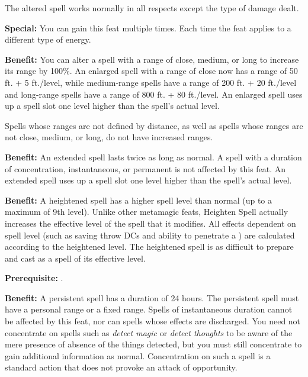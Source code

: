 The altered spell works normally in all respects except the type of damage dealt. 

\textbf{Special:} You can gain this feat multiple times. Each time the feat applies 
to a different type of energy.


\textbf{Benefit:} You can alter a spell with a range of close, medium, or long 
to increase its range by 100\%. An enlarged spell with a range of close now has 
a range of 50 ft. + 5 ft./level, while medium-range spells have a range of 200 
ft. + 20 ft./level and long-range spells have a range of 800 ft. + 80 ft./level. 
An enlarged spell uses up a spell slot one level higher than the spell's actual 
level.

Spells whose ranges are not defined by distance, as well as spells whose ranges 
are not close, medium, or long, do not have increased ranges.


\textbf{Benefit:} An extended spell lasts twice as long as normal. A spell with 
a duration of concentration, instantaneous, or permanent is not affected by this 
feat. An extended spell uses up a spell slot one level higher than the spell's 
actual level.


\textbf{Benefit:} A heightened spell has a higher spell level than normal (up to 
a maximum of 9th level). Unlike other metamagic feats, Heighten Spell actually 
increases the effective level of the spell that it modifies. All effects dependent 
on spell level (such as saving throw DCs and ability to penetrate a )
are calculated according to the heightened level. The 
heightened spell is as difficult to prepare and cast as a spell of its effective 
level.


\textbf{Prerequisite:} .

\textbf{Benefit:} A persistent spell has a duration of 24 hours. The persistent 
spell must have a personal range or a fixed range. Spells of instantaneous duration 
cannot be affected by this feat, nor can spells whose effects are discharged.  
You need not concentrate on spells such as \textit{detect magic} or\textit{ detect 
thoughts} to be aware of the mere presence of absence of the things detected, but 
you must still concentrate to gain additional information as normal.  Concentration 
on such a spell is a standard action that does not provoke an attack of opportunity. 

